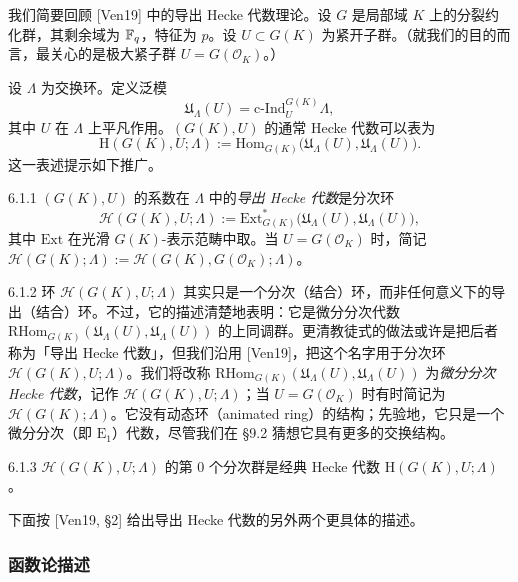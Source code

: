 我们简要回顾 [Ven19] 中的导出 Hecke 代数理论。设 $G$ 是局部域 $K$ 上的分裂约化群，其剩余域为 $\mathbb{F}_q$，特征为 $p$。设 $U\subset G(K)$ 为紧开子群。（就我们的目的而言，最关心的是极大紧子群 $U=G(\mathcal O_K)$。）

设 $\Lambda$ 为交换环。定义泛模
\[
\mathfrak U_\Lambda(U)=\mathrm{c\text{-}Ind}^{G(K)}_U\Lambda,
\]
其中 $U$ 在 $\Lambda$ 上平凡作用。$(G(K),U)$ 的通常 Hecke 代数可以表为
\[
\mathrm H(G(K),U;\Lambda):=\mathrm{Hom}_{G(K)}\bigl(\mathfrak U_\Lambda(U),\mathfrak U_\Lambda(U)\bigr).
\]
这一表述提示如下推广。

\begin{defn}{6.1.1}\label{thm:a6-04-1}
$(G(K),U)$ 的系数在 $\Lambda$ 中的\emph{导出 Hecke 代数}是分次环
\[
\mathcal H(G(K),U;\Lambda):=\mathrm{Ext}^*_{G(K)}\bigl(\mathfrak U_\Lambda(U),\mathfrak U_\Lambda(U)\bigr),
\]
其中 $\mathrm{Ext}$ 在光滑 $G(K)$-表示范畴中取。当 $U=G(\mathcal O_K)$ 时，简记 $\mathcal H(G(K);\Lambda):=\mathcal H(G(K),G(\mathcal O_K);\Lambda)$。
\end{defn}

\begin{rem}{6.1.2}\label{thm:a6-04-2}
环 $\mathcal H(G(K),U;\Lambda)$ 其实只是一个分次（结合）环，而非任何意义下的导出（结合）环。不过，它的描述清楚地表明：它是微分分次代数 $\mathrm{RHom}_{G(K)}(\mathfrak U_\Lambda(U),\mathfrak U_\Lambda(U))$ 的上同调群。更清教徒式的做法或许是把后者称为「导出 Hecke 代数」，但我们沿用 [Ven19]，把这个名字用于分次环 $\mathcal H(G(K),U;\Lambda)$。我们将改称 $\mathrm{RHom}_{G(K)}(\mathfrak U_\Lambda(U),\mathfrak U_\Lambda(U))$ 为\emph{微分分次 Hecke 代数}，记作 $\mathscr H(G(K),U;\Lambda)$；当 $U=G(\mathcal O_K)$ 时有时简记为 $\mathscr H(G(K);\Lambda)$。它没有动态环（animated ring）的结构；先验地，它只是一个微分分次（即 $\mathrm E_1$）代数，尽管我们在 §9.2 猜想它具有更多的交换结构。
\end{rem}

\begin{exam}{6.1.3}\label{thm:a6-04-3}
$\mathcal H(G(K),U;\Lambda)$ 的第 $0$ 个分次群是经典 Hecke 代数 $\mathrm H(G(K),U;\Lambda)$。
\end{exam}

下面按 [Ven19, §2] 给出导出 Hecke 代数的另外两个更具体的描述。


\subsubsection{函数论描述}

